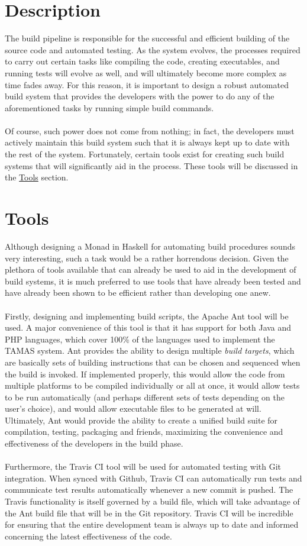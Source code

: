 \documentclass[12pt]{report}
\begin{document}
\section{Description}
The build pipeline is responsible for the successful and efficient building of the source code and
automated testing. As the system evolves, the processes required to carry out certain tasks like
compiling the code, creating executables, and running tests will evolve as well, and will ultimately
become more complex as time fades away. For this reason, it is important to design a robust automated
build system that provides the developers with the power to do any of the aforementioned tasks by
running simple build commands.\\\\
Of course, such power does not come from nothing; in fact, the developers must actively maintain
this build system such that it is always kept up to date with the rest of the system. Fortunately,
certain tools exist for creating such build systems that will significantly aid in the process.
These tools will be discussed in the \hyperref[s:build-tools]{Tools} section.
\section{Tools}
\label{s:build-tools}
Although designing a Monad in Haskell for automating build procedures sounds very interesting, such
a task would be a rather horrendous decision. Given the plethora of tools available that can already
be used to aid in the development of build systems, it is much preferred to use tools that have
already been tested and have already been shown to be efficient rather than developing one anew.\\\\
Firstly, designing and implementing build scripts, the Apache Ant tool will be used. A major
convenience of this tool is that it has support for both Java and PHP languages, which cover 100\%
of the languages used to implement the TAMAS system. Ant provides the ability to design multiple
\textit{build targets}, which are basically sets of building instructions that can be chosen and
sequenced when the build is invoked. If implemented properly, this would allow the code from
multiple platforms to be compiled individually or all at once, it would allow tests to be run
automatically (and perhaps different sets of tests depending on the user's choice), and would allow
executable files to be generated at will. Ultimately, Ant would provide the ability to create a
unified build suite for compilation, testing, packaging and friends, maximizing the convenience and
effectiveness of the developers in the build phase.\\\\
Furthermore, the Travis CI tool will be used for automated testing with Git integration. When synced
with Github, Travis CI can automatically run tests and communicate test results automatically
whenever a new commit is pushed. The Travis functionality is itself governed by a build file, which
will take advantage of the Ant build file that will be in the Git repository. Travis CI will be
incredible for ensuring that the entire development team is always up to date and informed
concerning the latest effectiveness of the code.
\end{document}
